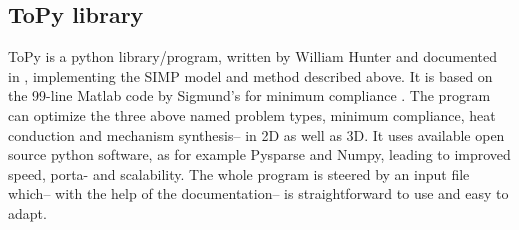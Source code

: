 \subsection{ToPy library}\label{sec:ToPy}
ToPy \cite{ToPy} is a python library/program, written by William Hunter and documented in \cite{Hunter2009}, implementing the SIMP model and method described above. It is based on the 99-line Matlab code by Sigmund's for minimum compliance \cite{sigmund200199}. The program can optimize the three above named problem types, minimum compliance, heat conduction and mechanism synthesis-- in 2D as well as 3D. It uses available open source python software, as for example Pysparse and Numpy, leading to improved speed, porta- and scalability. The whole program is steered by an input file which-- with the help of the documentation-- is straightforward to use and easy to adapt. 


